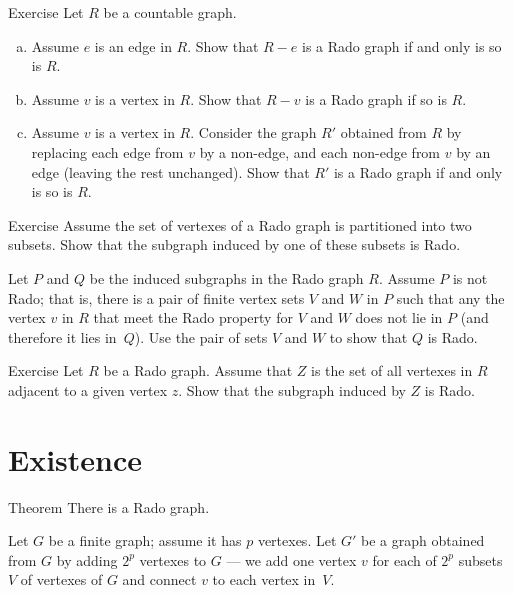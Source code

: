 \begin{thm}{Exercise}
Let $R$ be a countable graph. 
\begin{enumerate}[(a)]
 \item Assume  $e$ is an edge in $R$. 
 Show that $R-e$ is a Rado graph if and only is so is $R$.
 
 \item Assume $v$ is a vertex in $R$. 
 Show that $R-v$ is a Rado graph if so is $R$.
 
 \item Assume $v$ is a vertex in $R$. 
 Consider the graph $R'$ obtained from $R$ by replacing each edge from $v$ by a non-edge, and each non-edge from $v$ by an edge (leaving the rest unchanged).
 Show that $R'$ is a Rado graph if and only is so is $R$. 
\end{enumerate}

\end{thm}

\begin{thm}{Exercise}
Assume the set of vertexes of a Rado graph is partitioned into two subsets.
Show that the subgraph induced by one of these subsets is Rado.
\end{thm}

 Let $P$ and $Q$ be the induced subgraphs in the Rado graph $R$.
Assume $P$ is not Rado; that is, there is a pair of finite vertex sets $V$ and $W$ in $P$ such that any the vertex $v$ in $R$ that meet the Rado property for $V$ and $W$ does not lie in $P$ (and therefore it lies in~$Q$).
Use the pair of sets $V$ and $W$ to show that $Q$ is Rado.

\begin{thm}{Exercise}
Let $R$ be a Rado graph.
Assume that $Z$ is the set of all vertexes in $R$ adjacent to a given vertex $z$.
Show that the subgraph induced by $Z$ is Rado.
\end{thm}


\section*{Existence}

\begin{thm}{Theorem}
There is a Rado graph.
\end{thm}

Let $G$ be a finite graph; assume it has $p$ vertexes.
Let $G'$ be a graph obtained from $G$ by adding $2^p$ vertexes to $G$ --- we add one vertex $v$ for each of $2^p$ subsets $V$ of vertexes of $G$ and connect $v$ to each vertex in~$V$.

